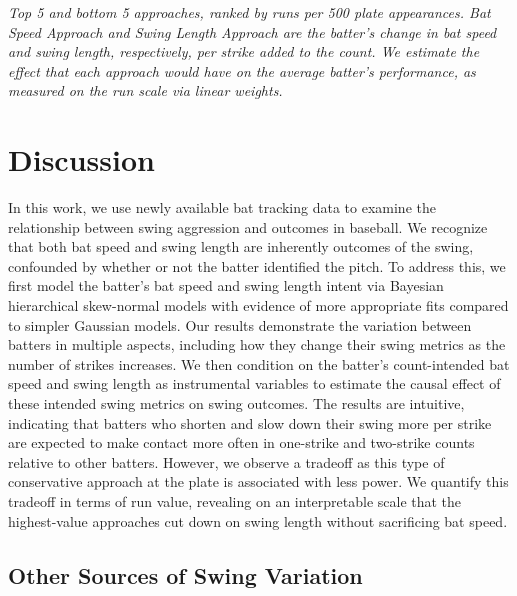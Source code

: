 \documentclass[
  12pt]{article}
\begin{document}
      \begin{table}
        \centering
        
        \caption{\it Top 5 and bottom 5 approaches, ranked by runs per 500 plate appearances. Bat Speed Approach and Swing Length Approach are the batter's change in bat speed and swing length, respectively, per strike added to the count. We estimate the effect that each approach would have on the average batter's performance, as measured on the run scale via linear weights.}
        \label{tab:approach-ranked}
      \end{table}

    
  \section{Discussion}
  \label{sec:discussion}


    In this work, we use newly available bat tracking data to examine the relationship between swing aggression and outcomes in baseball. We recognize that both bat speed and swing length are inherently outcomes of the swing, confounded by whether or not the batter identified the pitch. To address this, we first model the batter's bat speed and swing length intent via Bayesian hierarchical skew-normal models with evidence of more appropriate fits compared to simpler Gaussian models. Our results demonstrate the variation between batters in multiple aspects, including how they change their swing metrics as the number of strikes increases. We then condition on the batter's count-intended bat speed and swing length as instrumental variables to estimate the causal effect of these intended swing metrics on swing outcomes. The results are intuitive, indicating that batters who shorten and slow down their swing more per strike are expected to make contact more often in one-strike and two-strike counts relative to other batters. However, we observe a tradeoff as this type of conservative approach at the plate is associated with less power. We quantify this tradeoff in terms of run value, revealing on an interpretable scale that the highest-value approaches cut down on swing length without sacrificing bat speed. 

    \subsection{Other Sources of Swing Variation}
    \label{sec:results-other}
\end{document}
